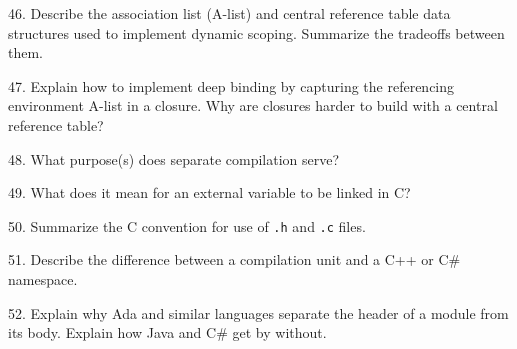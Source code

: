 46. Describe the association list (A-list) and central reference table data structures used to implement dynamic scoping. Summarize the tradeoffs between them.

\filbreak
\vskip 1cm

47. Explain how to implement deep binding by capturing the referencing environment A-list in a closure. Why are closures harder to build with a central reference table?

\filbreak
\vskip 1cm

48. What purpose(s) does separate compilation serve?

\filbreak
\vskip 1cm

49. What does it mean for an external variable to be linked in C?

\filbreak
\vskip 1cm

50. Summarize the C convention for use of {\tt .h} and {\tt .c} files.

\filbreak
\vskip 1cm

51. Describe the difference between a compilation unit and a C++ or C$\#$ namespace.

\filbreak
\vskip 1cm

52. Explain why Ada and similar languages separate the header of a module from its body. Explain how Java and C$\#$ get by without.
\filbreak
\vfill\eject
\bye
